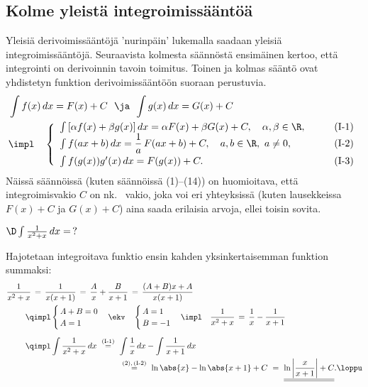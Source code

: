 \subsection{Kolme yleistä integroimissääntöä}

Yleisiä derivoimissääntöjä 'nurinpäin' lukemalla saadaan yleisiä integroimissääntöjä. 
Seuraavista kolmesta säännöstä ensimäinen kertoo, että integrointi on derivoinnin tavoin 
 toimitus. Toinen ja kolmas sääntö ovat yhdistetyn funktion
derivoimissääntöön suoraan perustuvia.
\begin{align*}
&\int f(x)\, dx=F(x)+C\ \ \ja\,\ \int g(x)\, dx=G(x)+C \\
&\impl \quad \left\{ \begin{array}{lr}
     \int\, [\alpha f(x)+\beta g(x)]\, dx
                =\alpha F(x) +\beta G(x) +C,\quad \alpha,\beta\in\R, &\qquad \text{(I-1)} \\
     \int f(ax+b)\, dx 
                =\dfrac{1}{a}\,F(ax+b)+C,\quad a,b\in\R, \ a\neq 0, &\qquad \text{(I-2)} \\[2mm]
     \int f(g(x))g'(x)\, dx = F(g(x))+C.     &\qquad \text{(I-3)}
                     \end{array} \right.
\end{align*}
Näissä säännöissä (kuten säännöissä (1)--(14)) on huomioitava, että integroimisvakio $C$ on nk.\
%
 vakio, joka voi eri yhteyksissä (kuten lausekkeissa $F(x)+C$ ja $G(x)+C$) aina
saada erilaisia arvoja, ellei toisin sovita.
\begin{Exa} \label{E10.1.2}
$\D\int\frac{1}{x^2+x}\, dx=\,?$
\end{Exa}
\ratk Hajotetaan integroitava funktio ensin kahden yksinkertaisemman funktion summaksi:
\begin{align*}
&\frac{1}{x^2+x} \,=\, \frac{1}{x(x+1)} \,=\, \frac{A}{x}+\frac{B}{x+1}
                                         \,=\, \frac{(A+B)x+A}{x(x+1)} \\ 
&\qquad\ \qimpl \begin{cases} \,A+B=0 \\ \,A=1 \end{cases}
         \ekv\quad \begin{cases} \,A=1 \\ \,B=-1  \end{cases} 
         \impl\quad \frac{1}{x^2+x} \,=\, \frac{1}{x}-\frac{1}{x+1} \\[2mm]
&\qquad\ \qimpl \int \frac{1}{x^2+x}\,dx\ 
                \overset{\text{(I-1)}}{=}\ \int \frac{1}{x}\, dx - \int\frac{1}{x+1}\, dx \\
&\hspace{48mm}\ \overset{(2),\,\text{(I-2)}}{=}\ \ln\abs{x}-\ln\abs{x+1}+C\
                    =\ \underline{\underline{\ln\left|\frac{x}{x+1}\right|+C}}. \loppu
\end{align*}

